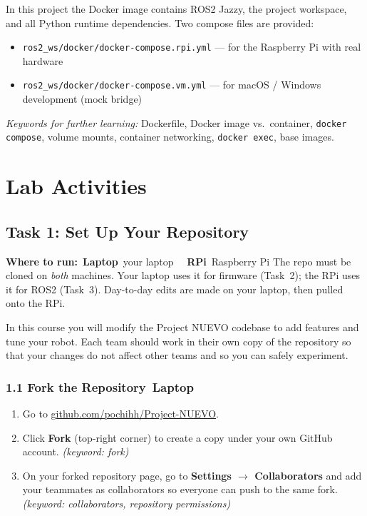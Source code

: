 \documentclass{ol-softwaremanual}
\newcommand{\onlaptop}{%
  \,\colorbox{green!25}{\footnotesize\sffamily\bfseries Laptop}}
\newcommand{\onrpi}{%
  \,\colorbox{blue!20}{\footnotesize\sffamily\bfseries RPi}}
\newcommand{\machinebox}[2]{%
  \par\noindent
  \colorbox{gray!12}{\parbox{\dimexpr\linewidth-2\fboxsep}{%
    \small\sffamily\textbf{Where to run:} #1 \quad\textbar\quad #2}}%
  \par\smallskip}
\newcommand{\doclink}[2]{\href{#1}{#2}}
\begin{document}
In this project the Docker image contains ROS2 Jazzy, the project workspace,
and all Python runtime dependencies.
Two compose files are provided:

\begin{itemize}
  \item \texttt{ros2\_ws/docker/docker-compose.rpi.yml} --- for the Raspberry Pi with real hardware
  \item \texttt{ros2\_ws/docker/docker-compose.vm.yml} --- for macOS / Windows development (mock bridge)
\end{itemize}

\noindent\textit{Keywords for further learning:}
Dockerfile, Docker image vs.\ container, \texttt{docker compose}, volume mounts,
container networking, \texttt{docker exec}, base images.


\section{Lab Activities}

\subsection{Task 1: Set Up Your Repository}

\machinebox{\onlaptop\ your laptop \textbar\ \onrpi\ Raspberry Pi}{The repo must be cloned on \emph{both} machines. Your laptop uses it for firmware (Task~2); the RPi uses it for ROS2 (Task~3). Day-to-day edits are made on your laptop, then pulled onto the RPi.}

In this course you will modify the Project NUEVO codebase to add features and
tune your robot.
Each team should work in their own copy of the repository so that your changes
do not affect other teams and so you can safely experiment.

\subsubsection*{1.1 Fork the Repository\onlaptop}

\begin{enumerate}
  \item Go to \doclink{https://github.com/pochihh/Project-NUEVO}{github.com/pochihh/Project-NUEVO}.
  \item Click \textbf{Fork} (top-right corner) to create a copy under your own GitHub account.
    \hfill\textit{(keyword: fork)}
  \item On your forked repository page, go to \textbf{Settings $\to$ Collaborators}
        and add your teammates as collaborators so everyone can push to the same fork.
    \hfill\textit{(keyword: collaborators, repository permissions)}
\end{enumerate}
\end{document}
